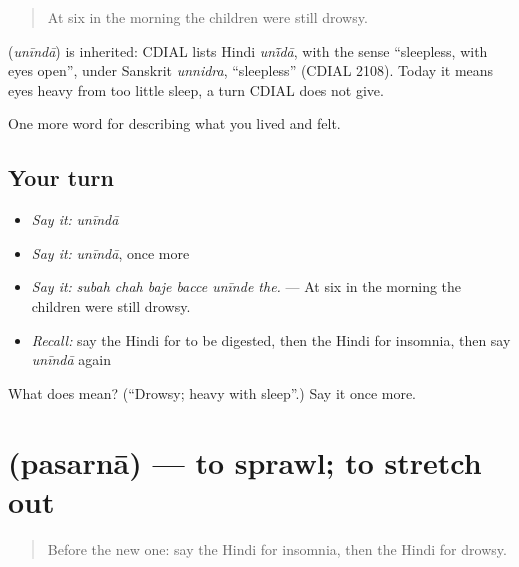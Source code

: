 \begin{quote}
At six in the morning the children were still drowsy.
\end{quote}

\begin{cousinweb}
\textbf{} (\emph{unīndā}) is inherited: CDIAL lists Hindi \emph{unī̃dā}, with the sense \textquotedblleft{}sleepless, with eyes open\textquotedblright{}, under Sanskrit \emph{unnidra}, \textquotedblleft{}sleepless\textquotedblright{} (CDIAL 2108). Today it means eyes heavy from too little sleep, a turn CDIAL does not give.
\end{cousinweb}

\begin{grammarlens}[title={What you've built}]
One more word for describing what you lived and felt.
\end{grammarlens}

\subsection*{Your turn}
\begin{itemize}
\raggedright
  \item \emph{Say it:} \emph{unīndā}
  \item \emph{Say it:} \emph{unīndā}, once more
  \item \emph{Say it:} \emph{subah chah baje bacce unīnde the.} — At six in the morning the children were still drowsy.
  \item \emph{Recall:} say the Hindi for to be digested, then the Hindi for insomnia, then say \emph{unīndā} again
\end{itemize}

\begin{tcolorbox}[breakable,colback=teal!4,colframe=teal!35!black,title={Before you move on}]
What does  mean? (\textquotedblleft{}Drowsy; heavy with sleep\textquotedblright{}.) Say it once more.
\end{tcolorbox}
\section[\texorpdfstring{\hi{पसरना} (pasarnā)}{पसरना (pasarnā)}]{ (pasarnā) — to sprawl; to stretch out}

\label{lesson:HI-C496-pasarna}



\begin{quote}
Before the new one: say the Hindi for insomnia, then the Hindi for drowsy.
\end{quote}

